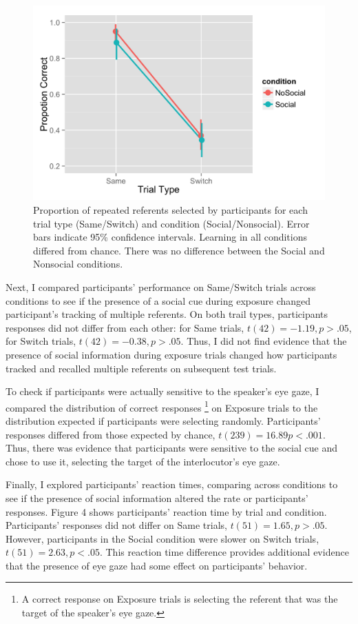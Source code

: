 \documentclass[10pt,letterpaper]{article}
\begin{document}
\begin{figure}[H]
	\centering
	\includegraphics[scale=0.15]{accuracydark.png}
	\caption{Proportion of repeated referents selected by participants for each trial type (Same/Switch) and condition (Social/Nonsocial). Error bars indicate 95\% confidence intervals. Learning in all conditions differed from chance. There was no difference between the Social and Nonsocial conditions.}
\end{figure}

Next, I compared participants' performance on Same/Switch trials across conditions to see if the presence of a social cue during exposure changed participant's tracking of multiple referents. On both trail types, participants responses did not differ from each other: for Same trials, $ t(42) = -1.19, p > .05$, for Switch trials, $t(42) = -0.38, p > .05$. Thus, I did not find evidence that the presence of social information during exposure trials changed how participants tracked and recalled multiple referents on subsequent test trials.

To check if participants were actually sensitive to the speaker's eye gaze, I compared the distribution of correct responses \footnote{A correct response on Exposure trials is selecting the referent that was the target of the speaker's eye gaze.} on Exposure trials to the distribution expected if participants were selecting randomly. Participants' responses differed from those expected by chance, $t(239) = 16.89  p < .001$. Thus, there was evidence that participants were sensitive to the social cue and chose to use it, selecting the target of the interlocutor's eye gaze.

Finally, I explored participants' reaction times, comparing across conditions to see if the presence of social information altered the rate or participants' responses. Figure 4 shows participants' reaction time by trial and condition. Participants' responses did not differ on Same trials, $t(51) = 1.65, p > .05$. However, participants in the Social condition were slower on Switch trials, $t(51) = 2.63, p < .05$. This reaction time difference provides additional evidence that the presence of eye gaze had some effect on participants' behavior.
\end{document}
